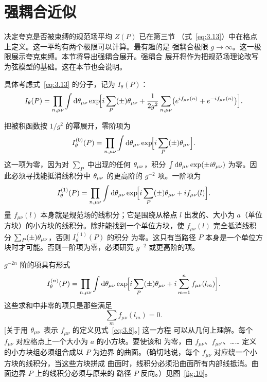 \section{强耦合近似}\label{sec:strong}

决定夸克是否被束缚的规范场平均 $Z(P)$ 已在第三节
（式~\eqref{eq:3.13}）中在格点上定义。这一平均有两个极限可以计算。最有趣的是
强耦合极限 $g \to \infty$。这一极限展示夸克束缚。本节将导出强耦合展开。强耦合
展开将作为把规范场理论改写为弦模型的基础。这在本节也会说明。

具体考虑式~\eqref{eq:3.13} 的分子，记为 $I_{\theta}(P)$：
\begin{equation}
I_{\theta}(P) = \prod_{n,\mu\nu}\int\mathrm{d}\theta_{\mu\nu}
  \exp\!\Bigl[i\sum_{P}(\pm)\theta_{\mu\nu}
    +\frac{1}{2g^{2}}\sum_{n,\mu\nu}
      \bigl(e^{if_{\mu\nu}(n)}+e^{-if_{\mu\nu}(n)}\bigr)\Bigr].
\label{eq:4.1}
\end{equation}

把被积函数按 $1/g^{2}$ 的幂展开，零阶项为
\begin{equation}
I_{\theta}^{(0)}(P) = \prod_{n,\mu\nu}\int\mathrm{d}\theta_{\mu\nu}
  \exp\!\Bigl[i\sum_{P}(\pm)\theta_{\mu\nu}\Bigr].
\label{eq:4.2}
\end{equation}
这一项为零，因为对 $\sum_{P}$ 中出现的任何 $\theta_{\mu\nu}$，积分
$\int\mathrm{d}\theta_{\mu\nu}\exp(\pm i\theta_{\mu\nu})$ 为零。因此必须寻找能抵消线积分中
$\theta_{\mu\nu}$ 的更高阶的 $g^{-2}$ 项。一阶项为
\begin{equation}
I_{\theta}^{(1)}(P) = \prod_{n,\mu\nu}\int\mathrm{d}\theta_{\mu\nu}
  \exp\!\Bigl[i\sum_{P}(\pm)\theta_{\mu\nu}+if_{\mu\nu}(l)\Bigr].
\label{eq:4.3}
\end{equation}
量 $f_{\mu\nu}(l)$ 本身就是规范场的线积分；它是围绕从格点 $l$ 出发的、大小为
$a$（单位方块）的小方块的线积分。除非能找到一个单位方块，使 $f_{\mu\nu}(l)$
完全抵消线积分 $\sum_{P}(\pm)\theta_{\mu\nu}$，否则 $I_{\theta}^{(1)}(P)$ 的积分
为零。这只有当路径 $P$ 本身是一个单位方块时才可能。否则一阶项为零，必须研究
$g^{-2}$ 或更高阶的项。

$g^{-2n}$ 阶的项具有形式
\begin{equation}
I_{\theta}^{(n)}(P) = \prod_{n,\mu\nu}\int\mathrm{d}\theta_{\mu\nu}
  \exp\!\Bigl[i\sum_{P}(\pm)\theta_{\mu\nu}
    + i\sum_{m=1}^{n}f_{\mu\nu}(l_{m})\Bigr].
\label{eq:4.4}
\end{equation}
这些求和中非零的项只是那些满足
\begin{equation}
\sum_{m}f_{\mu\nu}(l_{m}) = 0.
\label{eq:4.5}
\end{equation}
[关于用 $\theta_{\mu\nu}$ 表示 $f_{\mu\nu}$ 的定义见式~\eqref{eq:3.8}。] 这一方程
可以从几何上理解。每个 $f_{\mu\nu}$ 对应格点上一个大小为 $a$ 的小方块。要使该和
为零，由 $f_{\mu\nu}$、$f_{\mu\nu'}$、…… 定义的小方块组必须组合成以 $P$ 为边界
的曲面。（确切地说，每个 $f_{\mu\nu}$ 对应绕一个小方块的线积分，当这些方块拼成
曲面时，线积分必须沿曲面所有内部线抵消。曲面边界 $P$ 上的线积分必须与原来的
路径 $P$ 反向。）见图~\ref{fig:10}。

